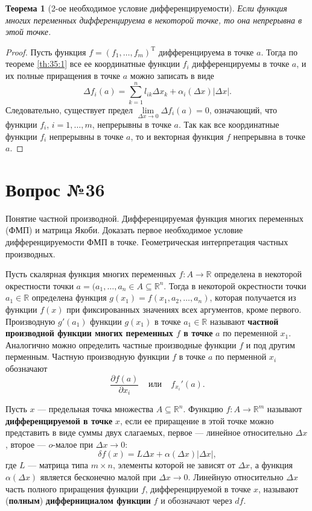 \documentclass[12pt]{report}
\numberwithin{equation}{section}
\newtheorem{theorem}{Теорема}[section]
\begin{document}
\begin{theorem}[2-ое необходимое условие дифференцируемости] \label{th:35:2}
Если функция многих переменных дифференцируема в некоторой точке, то она непрерывна в этой точке.
\end{theorem}
\begin{proof}
Пусть функция $f = (f_1, \ldots, f_m)^{\mathrm{T}}$ дифференцируема в точке $a$. Тогда по теореме \ref{th:35:1} все ее координатные функции $f_i$ дифференцируемы в точке $a$, и их полные приращения в точке $a$ можно записать в виде
\[ \Delta f_i (a) = \sum_{k =1}^n l_{ik} \Delta x_k + \alpha_i(\Delta x)|\Delta x|.\]
Следовательно, существует предел $\lim\limits_{\Delta x \to 0}\Delta f_i(a) = 0$, означающий, что функции $f_i$, $i = 1, \ldots, m$, непрерывны в точке $a$. Так как все координатные функции $f_i$ непрерывны в точке $a$, то и векторная функция $f$ непрерывна в точке $a$.
\end{proof}

\newpage \section{Вопрос №36} %
\begin{framed}
Понятие частной производной. Дифференцируемая функция многих переменных (ФМП) и матрица Якоби. Доказать первое необходимое условие дифференцируемости ФМП в точке. Геометрическая интерпретация частных производных.
\end{framed}
Пусть скалярная функция многих переменных $f : A \to \mathbb{R}$ определена в некоторой окрестности точки $a = (a_1, \ldots, a_n \in A \subseteq \mathbb{R}^n$. Тогда в некоторой окрестности точки $a_1 \in \mathbb{R}$ определена функция $g(x_1) = f(x_1, a_2, \ldots, a_n)$, которая получается из функции $f(x)$ при фиксированных значениях всех аргументов, кроме первого. Производную $g'(a_1)$ функции $g(x_1)$ в точке $a_1 \in \mathbb{R}$ называют \textbf{частной производной функции многих переменных $f$ в точке} $a$ по переменной $x_1$. Аналогично можно определить частные производные функции $f$ и под другим перменным. Частную производную функции $f$ в точке $a$ по перменной $x_i$ обозначают
\[\frac{\partial f(a) }{\partial x_i}~~~~~\text{или}~~~~~f_{x_i}'(a).\]

Пусть $x$ --- предельная точка множества $A \subseteq \mathbb{R}^n$. Функцию $f: A \to \mathbb{R}^m$ называют \textbf{дифференцируемой в точке} $x$, если ее приращение в этой точке можно представить в виде суммы двух слагаемых, первое --- линейное относительно $\Delta x$, второе --- $o$-малое при $\Delta x \to 0$:
\begin{equation} \label{eq:36:1}
\delta f(x) = L \Delta x + \alpha(\Delta x)|\Delta x|,
\end{equation}
где $L$ --- матрица типа $m \times n$, элементы которой не зависят от $\Delta x$, а функция $\alpha(\Delta x)$ является бесконечно малой при $\Delta x \to 0$. Линейную относительно $\Delta x$ часть полного приращения функции $f$, дифференцируемой в точке $x$, называют (\textbf{полным}) \textbf{диффернициалом функции} $f$ и обозначают через $df$.\\
\end{document}
